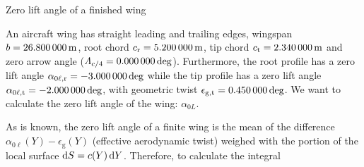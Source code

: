\documentclass[[12pt,twoside]{book}
\begin{document}
%
\begin{myExampleX}{Zero lift angle of a finished wing}{}%
\label{example:Zero:Lift:Angle:Of:A:Finished:Wing}
%

%
An aircraft wing has straight leading and trailing edges, wingspan $b=\SI[round-precision=1]{\mySpanWingMT}{\metre}$,
root chord $c_\mathrm{r}=\SI[round-precision=2]{\myChordRootWingMT}{\metre}$,
tip chord $c_\mathrm{t}=\SI[round-precision=2]{\myChordTipWingMT}{\metre}$
and zero arrow angle ($\Lambda_{c/4}=\SI[round-precision=1]{\mySweepQuarterChordWingDEG}{\deg}$).
Furthermore, the root profile has a zero lift angle $\alpha_{0\ell,\mathrm{r}}=\SI[round-precision=1]{\myAlphaZeroLiftRootWingDEG}{\deg}$
while the tip profile has a zero lift angle
$\alpha_{0\ell,\mathrm{t}}=\SI[round-precision=1]{\myAlphaZeroLiftTipWingDEG}{\deg}$,
with geometric twist
$\epsilon_{\mathrm{g,t}}=\SI[round-precision=1]{\myTwistWingDEG}{\deg}$. We want to calculate the zero lift angle of the wing: $\alpha_{0L}$.

\medskip
As is known, the zero lift angle of a finite wing is the mean of the difference $\alpha_{0\ell}(Y)-\epsilon_\mathrm{g}(Y)$ (effective aerodynamic twist) weighed with the portion of the local surface $\diff{S}=c(Y)\diff{Y}$. Therefore, to calculate the integral


\end{myExampleX}
\end{document}
